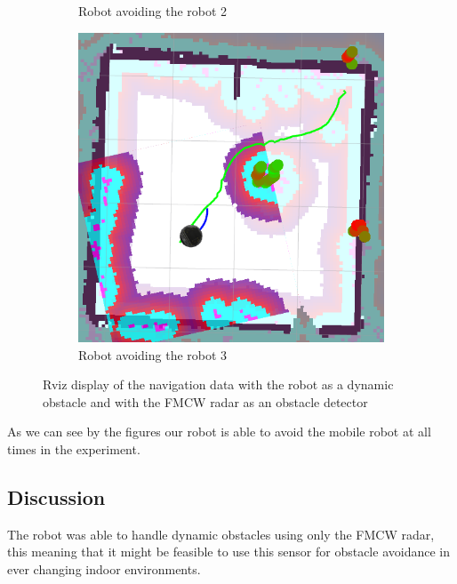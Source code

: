 \begin{figure}[ht!]
\begin{subfigure}[t]{0.3\linewidth}
    \caption{Robot avoiding the robot 2}
    \label{fig::robot2}
  \end{subfigure}
   \begin{subfigure}[t]{0.3\linewidth}
    \includegraphics[width=\linewidth]{imgs/chapter5/robot3.png}
    \caption{Robot avoiding the robot 3}
    \label{fig::robot3}
  \end{subfigure}
  \caption[Navigation data with the robot as a dynamic obstacle ]{Rviz display of the navigation data with the robot as a dynamic obstacle and with the \ac{FMCW} \ac{radar} as an obstacle detector}
  \label{fig:robot}
\end{figure}
As we can see by the figures our robot is able to avoid the mobile robot at all times in the experiment.
\subsection{Discussion}
The robot was able to handle dynamic obstacles using only the \ac{FMCW} \ac{radar}, this meaning that it might be feasible to use this sensor for obstacle avoidance in ever changing indoor environments.

